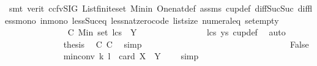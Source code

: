 \begin{isabellebody}
\ {\isacharparenleft}{\kern0pt}smt\ {\isacharparenleft}{\kern0pt}verit{\isacharcomma}{\kern0pt}\ ccfv{\isacharunderscore}{\kern0pt}SIG{\isacharparenright}{\kern0pt}\ List{\isachardot}{\kern0pt}finite{\isacharunderscore}{\kern0pt}set\ Min{\isacharunderscore}{\kern0pt}in\ One{\isacharunderscore}{\kern0pt}nat{\isacharunderscore}{\kern0pt}def\ assms{\isacharparenleft}{\kern0pt}{}{\isacharparenright}{\kern0pt}\ cup{\isacharunderscore}{\kern0pt}def\ diff{\isacharunderscore}{\kern0pt}Suc{\isacharunderscore}{\kern0pt}Suc\ diff{\isacharunderscore}{\kern0pt}less{\isacharunderscore}{\kern0pt}mono\ in{\isacharunderscore}{\kern0pt}mono\ less{\isacharunderscore}{\kern0pt}Suc{\isacharunderscore}{\kern0pt}eq\ less{\isacharunderscore}{\kern0pt}nat{\isacharunderscore}{\kern0pt}zero{\isacharunderscore}{\kern0pt}code\ list{\isachardot}{\kern0pt}size{\isacharparenleft}{\kern0pt}{}{\isacharparenright}{\kern0pt}\ numeral{\isacharunderscore}{\kern0pt}{}{\isacharunderscore}{\kern0pt}eq{\isacharunderscore}{\kern0pt}{}\ set{\isacharunderscore}{\kern0pt}empty{}{\isacharparenright}{\kern0pt}\isanewline
\ \ \ \ \ \ \ \ \ \ \ \ \isamarkupfalse%
\ \ C{}{\isacharcolon}{\kern0pt}\ {\isachardoublequoteopen}Min\ {\isacharparenleft}{\kern0pt}set\ lcs{\isacharparenright}{\kern0pt}\ {\isasymin}\ Y{\isachardoublequoteclose}\isanewline
\ \ \ \ \ \ \ \ \ \ \ \ \ \ \isamarkupfalse%
\ lcs\ ys\ cup{\isacharunderscore}{\kern0pt}def\ \isamarkupfalse%
\ auto\isanewline
\ \ \ \ \ \ \ \ \ \ \ \ \isamarkupfalse%
\ {\isacharquery}{\kern0pt}thesis\ \isamarkupfalse%
\ C{}\ C{}\ \isamarkupfalse%
\ simp\isanewline
\ \ \ \ \ \ \ \ \ \isanewline
\ \ \ \ \ \ \ \ \ \ \isamarkupfalse%
\isanewline
\isanewline
\ \ \ \ \ \ \ \ \ \ \ \ \isamarkupfalse%
\ False\isanewline
\ \ \ \ \ \ \ \ \ \ \ \ \isamarkupfalse%
\ {}{\isacharcolon}{\kern0pt}{\isachardoublequoteopen}min{\isacharunderscore}{\kern0pt}conv\ {\isacharparenleft}{\kern0pt}k{\isacharparenright}{\kern0pt}\ {\isacharparenleft}{\kern0pt}l{\isacharminus}{\kern0pt}{}{\isacharparenright}{\kern0pt}\ {\isasymge}\ card\ {\isacharparenleft}{\kern0pt}X\ {\isacharminus}{\kern0pt}\ Y{\isacharparenright}{\kern0pt}\ {\isacharplus}{\kern0pt}\ {}{\isachardoublequoteclose}\ \isamarkupfalse%
\ simp\isanewline
\isanewline
\ \ \ \ \ \ \ \ \ \ \ \ \isamarkupfalse%

\end{isabellebody}
